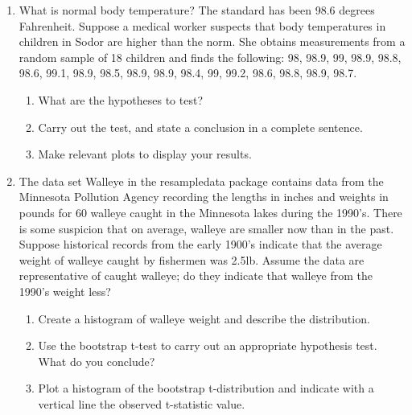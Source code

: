 \documentclass[12pt]{article}\usepackage[]{graphicx}\usepackage[]{color}
\begin{document}
\begin{enumerate}
    \item What is normal body temperature? The standard has been 98.6 degrees Fahrenheit. Suppose a medical worker suspects that body temperatures in children in Sodor are higher than the norm. She obtains measurements from a random sample of 18 children and finds the following: 98, 98.9, 99, 98.9, 98.8, 98.6, 99.1, 98.9, 98.5, 98.9, 98.9, 98.4, 99, 99.2, 98.6, 98.8, 98.9, 98.7. 
    \begin{enumerate}
      \item What are the hypotheses to test? 
      \item Carry out the test, and state a conclusion in a complete sentence. 
      \item Make relevant plots to display your results.  
    \end{enumerate}
    \item The data set Walleye in the resampledata package contains data from the Minnesota Pollution Agency recording the lengths in inches and weights in pounds for 60 walleye caught in the Minnesota lakes during the 1990's. There is some suspicion that on average, walleye are smaller now than in the past. Suppose historical records from the early 1900's indicate that the average weight of walleye caught by fishermen was 2.5lb. Assume the data are representative of caught walleye; do they indicate that walleye from the 1990's weight less?
    \begin{enumerate}
      \item Create a histogram of walleye weight and describe the distribution. 
      \item Use the bootstrap t-test to carry out an appropriate hypothesis test. What do you conclude? 
      \item Plot a histogram of the bootstrap t-distribution and indicate with a vertical line the observed t-statistic value. 
    \end{enumerate}
  \end{enumerate}
    
\end{document}
